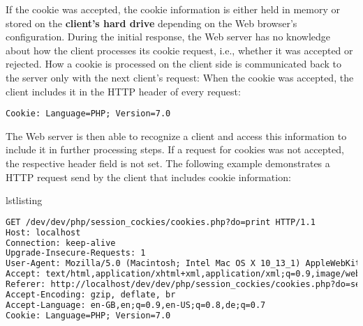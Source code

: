 \documentclass[a4paper, justified, notoc]{tufte-handout} %
\makeatletter
\newenvironment{listing}[1][htbp]
  {\ifvmode\else\unskip\fi\begin{@tufte@float}[#1]{lstlisting}{}}
  {\end{@tufte@float} } %
\makeatother
\begin{document}
If the cookie was accepted, the cookie information is either held in memory or stored on the \textbf{client's hard drive} depending on the Web browser's configuration. %
During the initial response, the Web server has no knowledge about how the client processes its cookie request, i.e., whether it was accepted or rejected.
How a cookie is processed on the client side is communicated back to the server only with the next client's request: When the cookie was accepted, the client includes it in the HTTP header of every request:
\begin{Verbatim}
Cookie: Language=PHP; Version=7.0
\end{Verbatim}
The Web server is then able to recognize a client and access this information to include it in further processing steps.
If a request for cookies was not accepted, the respective header field is not set.
The following example demonstrates a HTTP request send by the client that includes cookie information:
\begin{listing}
\begin{lstlisting}[language=HTML]
GET /dev/dev/php/session_cockies/cookies.php?do=print HTTP/1.1
Host: localhost
Connection: keep-alive
Upgrade-Insecure-Requests: 1
User-Agent: Mozilla/5.0 (Macintosh; Intel Mac OS X 10_13_1) AppleWebKit/537.36 (KHTML, like Gecko) Chrome/63.0.3239.84 Safari/537.36
Accept: text/html,application/xhtml+xml,application/xml;q=0.9,image/webp,image/apng,*/*;q=0.8
Referer: http://localhost/dev/dev/php/session_cockies/cookies.php?do=set
Accept-Encoding: gzip, deflate, br
Accept-Language: en-GB,en;q=0.9,en-US;q=0.8,de;q=0.7
Cookie: Language=PHP; Version=7.0
\end{lstlisting}
	\caption{A client's HTTP request with cookie data included}
	\label{setting_cookies}
\end{listing}
\end{document}
